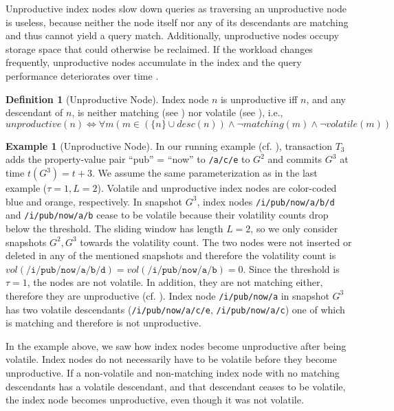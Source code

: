\documentclass[abstracton,12pt]{scrartcl}
\theoremstyle{definition}
\newtheorem{definition}{Definition}
\newtheorem{example}{Example}
\begin{document}
Unproductive index nodes slow down
queries as traversing an unproductive node is useless, because neither the node
itself nor any of its descendants are matching and thus cannot
yield a query match. Additionally, unproductive nodes occupy storage space that
could otherwise be reclaimed. If the workload changes frequently, unproductive
nodes accumulate in the index and the query performance deteriorates
over time \cite{KW17}.

\begin{definition}[Unproductive Node]
  Index node $n$ is unproductive iff $n$, and any descendant of
  $n$, is neither matching (see ) nor volatile (see
  ), i.e.,
  $$ unproductive(n) \iff \forall  m (m \in (\{n\} \cup desc(n)) \land
  \neg matching(m) \land \neg volatile(m))$$
  \label{def:unproductive-node}
\end{definition}

\vspace{-0.6cm}

\begin{example}[Unproductive Node]
  In our running example (cf. ), transaction $T_3$ adds
  the property-value pair ``pub'' = ``now'' to \texttt{/a/c/e} to $G^2$ and commits $G^3$ at time
  $t(G^3) = t+3$. We assume the same parameterization as in the last example
  ($\tau = 1, L = 2$). Volatile and unproductive index nodes are color-coded
  blue and orange, respectively.
  In snapshot $G^3$, index nodes \texttt{/i/pub/now/a/b/d} and
  \texttt{/i/pub/now/a/b} cease to be volatile because their 
  volatility counts drop below the threshold. The sliding window has length $L =
  2$, so we only consider snapshots $G^2,G^3$ towards the volatility count. The two
  nodes were not inserted or deleted in any of the mentioned snapshots and
  therefore the volatility count is $vol(\texttt{/i/pub/now/a/b/d}) =
  vol(\texttt{/i/pub/now/a/b}) = 0$. Since the threshold is $\tau = 1$, the nodes are
  not volatile. In addition,
  they are not matching either, therefore they are unproductive (cf.
  ). Index node
  \texttt{/i/pub/now/a} in snapshot $G^3$ has
  two volatile descendants (\texttt{/i/pub/now/a/c/e}, \texttt{/i/pub/now/a/c}) 
  one of which is matching and therefore is not unproductive.
  \label{ex:unproductive-node}
\end{example}

In the example above, we saw how index nodes become unproductive after being
volatile. Index nodes do not necessarily have to be volatile before they become
unproductive.
If a non-volatile and non-matching index node with no matching descendants has a
volatile descendant, and that descendant ceases to
be volatile, the index node becomes unproductive, even though it was not
volatile.
\end{document}

